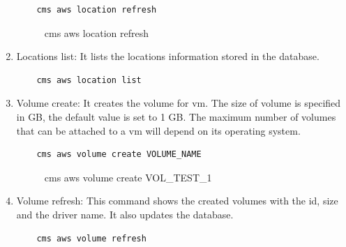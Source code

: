 \documentclass[9pt,twocolumn,twoside]{../../styles/osajnl}
\begin{document}
\begin{enumerate}
    \begin{verbatim}
    cms aws location refresh
    \end{verbatim}
    
    \begin{figure}[h!]
    	\centering
    	\caption{cms aws location refresh}
    	\label{fig:locationlist}
    \end{figure}


	\item Locations list: It lists the locations information stored in the database.
	
	\begin{verbatim}
	cms aws location list
	\end{verbatim}
	
    \item Volume create: It creates the volume for vm. The size of volume is specified in GB, the default value is set to 1 GB. The maximum number of volumes that can be attached to a vm will depend on its operating system.
    
    \begin{verbatim}
    cms aws volume create VOLUME_NAME
    \end{verbatim}
    
    \begin{figure}[h!]
    	\centering
    	\caption{cms aws volume create VOL\_TEST\_1}
    	\label{fig:createvolume}
    \end{figure}
     
    \item Volume refresh: This command shows the created volumes with the id, size and the driver name. It also updates the database.
    
    \begin{verbatim}
    cms aws volume refresh
    \end{verbatim}
    

\end{enumerate}
\end{document}
